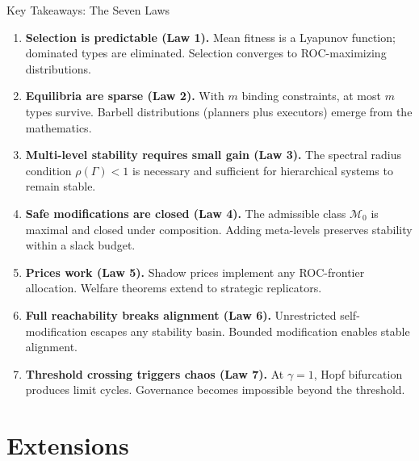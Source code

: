\documentclass[12pt]{article}
\begin{document}

\begin{takeawaybox}{Key Takeaways: The Seven Laws}
\begin{enumerate}
    \item \textbf{Selection is predictable (Law 1).} Mean fitness is a Lyapunov function; dominated types are eliminated. Selection converges to ROC-maximizing distributions.
    
    \item \textbf{Equilibria are sparse (Law 2).} With $m$ binding constraints, at most $m$ types survive. Barbell distributions (planners plus executors) emerge from the mathematics.
    
    \item \textbf{Multi-level stability requires small gain (Law 3).} The spectral radius condition $\rho(\Gamma) < 1$ is necessary and sufficient for hierarchical systems to remain stable.
    
    \item \textbf{Safe modifications are closed (Law 4).} The admissible class $\mathcal{M}_0$ is maximal and closed under composition. Adding meta-levels preserves stability within a slack budget.
    
    \item \textbf{Prices work (Law 5).} Shadow prices implement any ROC-frontier allocation. Welfare theorems extend to strategic replicators.
    
    \item \textbf{Full reachability breaks alignment (Law 6).} Unrestricted self-modification escapes any stability basin. Bounded modification enables stable alignment.
    
    \item \textbf{Threshold crossing triggers chaos (Law 7).} At $\gamma = 1$, Hopf bifurcation produces limit cycles. Governance becomes impossible beyond the threshold.
\end{enumerate}
\end{takeawaybox}


\part{Extensions}
\end{document}
